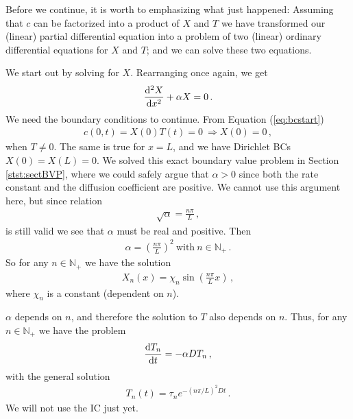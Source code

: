 Before we continue, it is worth to emphasizing what just happened: 
Assuming that $c$ can be factorized into 
a product of $X$ and $T$ we have transformed our (linear) 
partial differential equation into a problem of two (linear) ordinary differential 
equations for $X$ and $T$; and we can solve these two equations. 

We start out by solving for $X$. Rearranging once again, we get
\begin{eqnarray}
	\frac{\mathrm{d}^2 X}{\mathrm{d} x^2} + \alpha X = 0 \, .
\end{eqnarray}
We need the boundary conditions to continue. From Equation (\ref{eq:bcstart}) 
\begin{eqnarray}
	c(0, t) = X(0)T(t) = 0 \ \Rightarrow X(0) = 0\, ,
\end{eqnarray}
when $T \neq 0$.  The same is true for $x=L$, and we have Dirichlet BCs $X(0)=X(L)=0$. 
We solved this exact boundary value problem in Section \ref{stst:sectBVP}, where
we could safely argue that $\alpha > 0$ since both the rate constant and the
diffusion coefficient are positive. We cannot use this argument here, but since 
relation 
\begin{eqnarray}
	\sqrt{\alpha} = \frac{n\pi}{L} \, , 
\end{eqnarray}
is still valid we see that $\alpha$ must be real and positive. Then
\begin{eqnarray}
	\alpha = \left( \frac{n \pi}{L} \right)^2 \ \text{with} \ n \in \mathbb{N}_+ \, . 
\end{eqnarray}
So for any $n \in \mathbb{N}_+$ we have the solution
\begin{eqnarray}
	X_n(x) = \chi_n \sin\left(\frac{n\pi}{L} x\right) \, ,
\end{eqnarray}
where $\chi_n$ is a constant (dependent on $n$).

$\alpha$ depends on $n$, and therefore the solution to $T$ also depends on
$n$. Thus, for any $n \in \mathbb{N}_+$ we have the problem
\begin{eqnarray}
	\frac{\mathrm{d} T_n}{\mathrm{d} t} = -\alpha D T_n \, ,
\end{eqnarray}
with the general solution
\begin{eqnarray}
	T_n(t) = \tau_n e^{-(n\pi/L)^2Dt} \, .
\end{eqnarray}
We will not use the IC just yet. 

